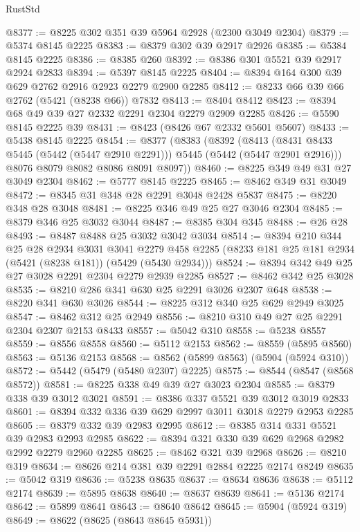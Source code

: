 \begin{lexlean}{RustStd}
\begin{coremodule}
@8377 := @8225 @302 @351 @39 @5964 @2928 (@2300 @3049 @2304)
@8379 := @5374 @8145 @2225
@8383 := @8379 @302 @39 @2917 @2926
@8385 := @5384 @8145 @2225
@8386 := @8385 @260
@8392 := @8386 @301 @5521 @39 @2917 @2924 @2833
@8394 := @5397 @8145 @2225
@8404 := @8394 @164 @300 @39 @629 @2762 @2916 @2923 @2279 @2900 @2285
@8412 := @8233 @66 @39 @66 @2762 (@5421 (@8238 @66)) @7832
@8413 := @8404 @8412
@8423 := @8394 @68 @49 @39 @27 @2332 @2291 @2304 @2279 @2909 @2285
@8426 := @5590 @8145 @2225 @39
@8431 := @8423 (@8426 @67 @2332 @5601 @5607)
@8433 := @5438 @8145 @2225
@8454 := @8377
    (@8383
      (@8392
        (@8413 (@8431 @8433 @5445 (@5442 (@5447 @2910 @2291))) @5445 (@5442 (@5447 @2901 @2916)))
        @8076
        @8079
        @8082
        @8086
        @8091
        @8097))
@8460 := @8225 @349 @49 @31 @27 @3049 @2304
@8462 := @5777 @8145 @2225
@8465 := @8462 @349 @31 @3049
@8472 := @8345 @31 @348 @28 @2291 @3048 @2428 @5837
@8475 := @8220 @348 @28 @3048
@8481 := @8225 @346 @49 @25 @27 @3046 @2304
@8485 := @8379 @346 @25 @3032 @3044
@8487 := @8385 @304 @345
@8488 := @26 @28
@8493 := @8487 @8488 @25 @3032 @3042 @3034
@8514 := @8394
    @210
    @344
    @25
    @28
    @2934
    @3031
    @3041
    @2279
    @458
    @2285
    (@8233 @181 @25 @181 @2934 (@5421 (@8238 @181)) (@5429 (@5430 @2934)))
@8524 := @8394 @342 @49 @25 @27 @3028 @2291 @2304 @2279 @2939 @2285
@8527 := @8462 @342 @25 @3028
@8535 := @8210 @286 @341 @630 @25 @2291 @3026 @2307 @648
@8538 := @8220 @341 @630 @3026
@8544 := @8225 @312 @340 @25 @629 @2949 @3025
@8547 := @8462 @312 @25 @2949
@8556 := @8210 @310 @49 @27 @25 @2291 @2304 @2307 @2153 @8433
@8557 := @5042 @310
@8558 := @5238 @8557
@8559 := @8556 @8558
@8560 := @5112 @2153
@8562 := @8559 (@5895 @8560)
@8563 := @5136 @2153
@8568 := @8562 (@5899 @8563) (@5904 (@5924 @310))
@8572 := @5442 (@5479 (@5480 @2307) @2225)
@8575 := @8544 (@8547 (@8568 @8572))
@8581 := @8225 @338 @49 @39 @27 @3023 @2304
@8585 := @8379 @338 @39 @3012 @3021
@8591 := @8386 @337 @5521 @39 @3012 @3019 @2833
@8601 := @8394 @332 @336 @39 @629 @2997 @3011 @3018 @2279 @2953 @2285
@8605 := @8379 @332 @39 @2983 @2995
@8612 := @8385 @314 @331 @5521 @39 @2983 @2993 @2985
@8622 := @8394 @321 @330 @39 @629 @2968 @2982 @2992 @2279 @2960 @2285
@8625 := @8462 @321 @39 @2968
@8626 := @8210 @319
@8634 := @8626 @214 @381 @39 @2291 @2884 @2225 @2174 @8249
@8635 := @5042 @319
@8636 := @5238 @8635
@8637 := @8634 @8636
@8638 := @5112 @2174
@8639 := @5895 @8638
@8640 := @8637 @8639
@8641 := @5136 @2174
@8642 := @5899 @8641
@8643 := @8640 @8642
@8645 := @5904 (@5924 @319)
@8649 := @8622 (@8625 (@8643 @8645 @5931))

\end{coremodule}
\end{lexlean}
